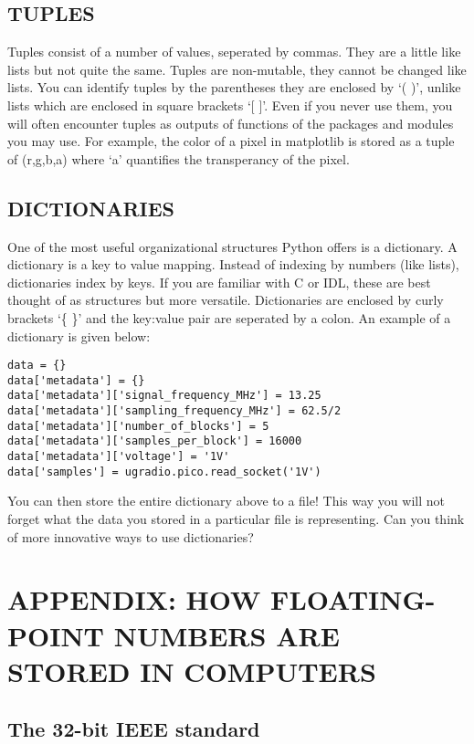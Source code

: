 \documentclass[psfig,preprint]{aastex}
\begin{document}
\subsection{TUPLES}
Tuples consist of a number of values, seperated by commas. They are a 
little like lists but not quite the same. Tuples are non-mutable, they 
cannot be changed like lists. You can identify tuples by the parentheses 
they are enclosed by `( )', unlike lists which are enclosed in square 
brackets `[ ]'. Even if you never use them, you will often encounter tuples 
as outputs of functions of the packages and modules you may use. For example, 
the color of a pixel in matplotlib is stored as a tuple of (r,g,b,a) where `a' 
quantifies the transperancy of the pixel.

\subsection{DICTIONARIES}
One of the most useful organizational structures Python offers is a dictionary. 
A dictionary is a key to value mapping. Instead of indexing by numbers 
(like lists), dictionaries index by keys. If you are familiar with C or IDL, 
these are best thought of as structures but more versatile. Dictionaries are 
enclosed by curly brackets `\{ \}' and the key:value pair are seperated by 
a colon. An example of a dictionary is given below:

\begin{lstlisting}
data = {}
data['metadata'] = {}
data['metadata']['signal_frequency_MHz'] = 13.25
data['metadata']['sampling_frequency_MHz'] = 62.5/2
data['metadata']['number_of_blocks'] = 5
data['metadata']['samples_per_block'] = 16000
data['metadata']['voltage'] = '1V'
data['samples'] = ugradio.pico.read_socket('1V')
\end{lstlisting}

You can then store the entire dictionary above to a file! This way you 
will not forget what the data you stored in a particular file is representing. 
Can you think of more innovative ways to use dictionaries? 

\section{APPENDIX: HOW FLOATING-POINT NUMBERS ARE STORED IN COMPUTERS}

\subsection{The 32-bit IEEE standard}
\end{document}
